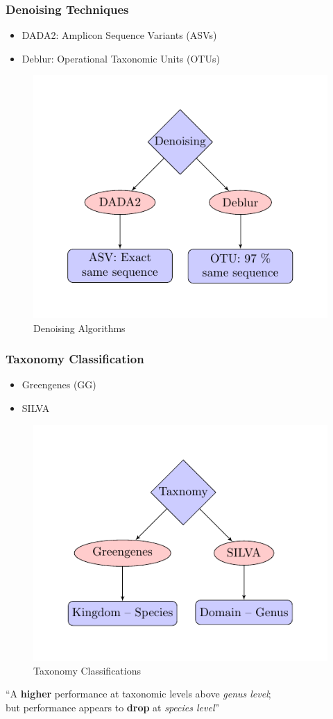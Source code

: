 \documentclass{beamer}
\begin{document}
    \begin{frame}
        \frametitle{Denoising Techniques}

        \begin{itemize}
            \item DADA2: Amplicon Sequence Variants (ASVs) \cite{DADA2}
            \item Deblur: Operational Taxonomic Units (OTUs) \cite{Deblur1}
        \end{itemize}

        \begin{figure}
            \includegraphics[width=0.4 \linewidth]{figures/tikz/denoising.pdf}
            \caption{Denoising Algorithms}
        \end{figure}
    \end{frame}

    \begin{frame}
        \frametitle{Taxonomy Classification}

        \begin{itemize}
            \item Greengenes (GG) \cite{greengenes1}
            \item SILVA \cite{silva1, silva2}
        \end{itemize}

        \begin{figure}
            \includegraphics[width=0.4 \linewidth]{figures/tikz/taxonomy.pdf}
            \caption{Taxonomy Classifications}
        \end{figure}

        “A \textbf{higher} performance at taxonomic levels above \textit{genus level}; \\
        but performance appears to \textbf{drop} at \textit{species level}” \cite{performance1}
    \end{frame}
\end{document}
